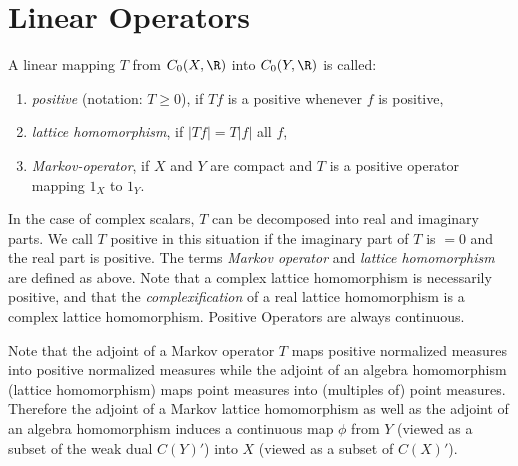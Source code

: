 \section{Linear Operators}\label{sec:b1-1.3}
A linear mapping $T$ from $C_{0}(X,\R)$ into $C_{0}(Y,\R)$ is called:
\begin{enumerate}[label=]

\item
\emph{positive} (notation: $T \geq 0$), if $Tf$  is a positive whenever $ f $ is positive, 

\item
\emph{lattice homomorphism}, if $|Tf| = T|f|$  all $ f $,

\item
\emph{Markov-operator}, if  $ X $ and $ Y $ are compact and $ T $ is a positive operator mapping $1_{X}$ to $1_{Y}$.

\end{enumerate}
In the case of complex scalars, $T$ can be decomposed into real and imaginary parts.
We call $T$ positive in this situation if the imaginary part of $T$ is $= 0$ and the real part is positive.
The terms \emph{Markov operator} and \emph{lattice homomorphism} are defined as above.
Note that a complex lattice homomorphism is necessarily positive, and that the \emph{complexification} of a real lattice homomorphism is a complex lattice homomorphism.
Positive Operators are always continuous.

Note that the adjoint of a Markov operator $T$ maps positive normalized measures into positive normalized measures while the adjoint of an algebra homomorphism (lattice homomorphism) maps point measures into (multiples of) point measures.
Therefore the adjoint of a Markov lattice homomorphism as well as the adjoint of an algebra homomorphism induces a continuous map $\phi$ from $Y$ (viewed as a subset of the weak dual $C(Y)'$) into $X$ (viewed as a subset of $C(X)'$).

